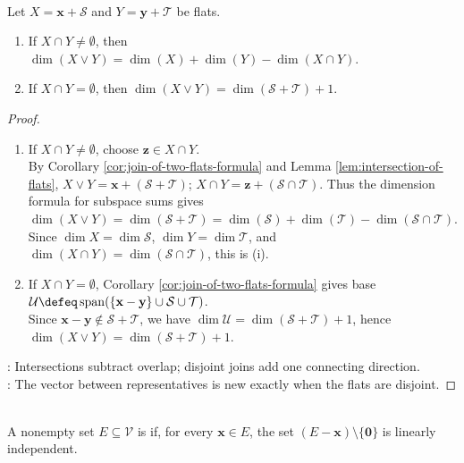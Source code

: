 \begin{corollary} \label{cor:dimension-of-join-of-flats} \\
Let $X=\mathbf{x}+\mathcal{S}$ and $Y=\mathbf{y}+\mathcal{T}$ be flats.
\begin{enumerate}[label=(\roman*)]
\setlength{\itemsep}{0pt}
\item If $X\cap Y\neq\emptyset$, then $\dim(X\vee Y)=\dim(X)+\dim(Y)-\dim(X\cap Y)$.
\item If $X\cap Y=\emptyset$, then $\dim(X\vee Y)=\dim(\mathcal{S}+\mathcal{T})+1$.
\end{enumerate}
\begin{proof}
\begin{enumerate}[label=(\roman*)]
\setlength{\itemsep}{0pt}
\item If $X\cap Y\neq\emptyset$, choose $\mathbf{z}\in X\cap Y$.\\
By Corollary \ref{cor:join-of-two-flats-formula} and Lemma \ref{lem:intersection-of-flats}, $X\vee Y=\mathbf{x}+(\mathcal{S}+\mathcal{T})$; $X\cap Y=\mathbf{z}+(\mathcal{S}\cap\mathcal{T})$. Thus the dimension formula for subspace sums gives $\dim(X\vee Y)=\dim(\mathcal{S}+\mathcal{T}) =\dim(\mathcal{S})+\dim(\mathcal{T})-\dim(\mathcal{S}\cap\mathcal{T})$.\\
Since $\dim X=\dim\mathcal{S}$, $\dim Y=\dim\mathcal{T}$, and $\dim(X\cap Y)=\dim(\mathcal{S}\cap\mathcal{T})$, this is (i).
\item If $X\cap Y=\emptyset$, Corollary \ref{cor:join-of-two-flats-formula} gives base $\mathcal{U}\defeq\operatorname{span}(\{\mathbf{x}-\mathbf{y}\}\cup\mathcal{S}\cup\mathcal{T})$.\\
Since $\mathbf{x}-\mathbf{y}\notin\mathcal{S}+\mathcal{T}$, we have $\dim\mathcal{U}=\dim(\mathcal{S}+\mathcal{T})+1$, hence $\dim(X\vee Y)=\dim(\mathcal{S}+\mathcal{T})+1$.
\end{enumerate}
: Intersections subtract overlap; disjoint joins add one connecting direction.\\
: The vector between representatives is new exactly when the flats are disjoint.
\end{proof}
\end{corollary}

\begin{definition} \label{def:affinely-independent-set} \\
A nonempty set $E\subseteq\mathcal{V}$ is  if, for every $\mathbf{x}\in E$, the set $(E-\mathbf{x})\setminus\{\mathbf{0}\}$ is linearly independent.
\end{definition}

